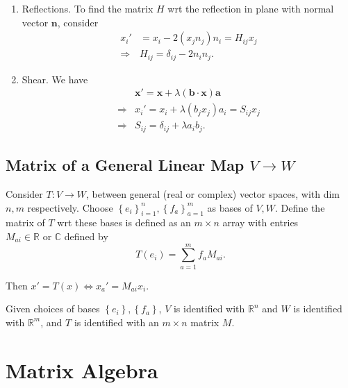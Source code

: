 \documentclass[10pt]{article}
\begin{document}
\begin{example}
\begin{enumerate}[(1)]
            \item Reflections. To find the matrix $H$ wrt the reflection in plane with normal vector $ \mathbf{n} $, consider 
            \[
                \begin{aligned}
                     x_i'&=x_i-2(x_jn_j)n_i=H_{ij}x_j\\
                     \Longrightarrow & H_{ij}=\delta_{ij}-2n_in_j.
                \end{aligned}
            \]
            \item Shear. We have 
            \[
                \begin{aligned}
                     &\mathbf{x}'=\mathbf{x}+\lambda(\mathbf{b}\cdot \mathbf{x})\mathbf{a}\\
                    \Longrightarrow & x_i'=x_i+\lambda(b_jx_j)a_i=S_{ij}x_j\\
                    \Longrightarrow & S_{ij}=\delta_{ij}+\lambda a_i b_j.
                \end{aligned}
            \]
        \end{enumerate}
    \end{example}
    \subsection{Matrix of a General Linear Map $ V\to W $}
    \begin{definition}
        Consider $ T:V\to W $, between general (real or complex) vector spaces, with dim $n,m$ respectively. Choose $ \left\{ e_i\right\}_{i=1}^n, \left\{ f_a\right\}_{a=1}^m $ as bases of $ V,W $. Define the matrix of $T$ wrt these bases is defined as an $m\times n$ array with entries $ M_{ai}\in \mathbb{R}\text{ or }\mathbb{C}  $ defined by 
        \[
            T(e_i)=\sum_{a=1}^{m}f_a M_{ai}
        .\]
    \end{definition}
    Then $ x'=T(x) \Leftrightarrow x_a'=M_{ai}x_i $.
    \begin{remark}
        Given choices of bases $ \left\{ e_i\right\},\left\{ f_a\right\} $, $V$ is identified with $ \mathbb{R}^{n} $ and $W$ is identified with $ \mathbb{R}^{m} $, and $T$ is identified with an $m \times n$ matrix $M$. 
    \end{remark}
    \section{Matrix Algebra}
\end{document}
